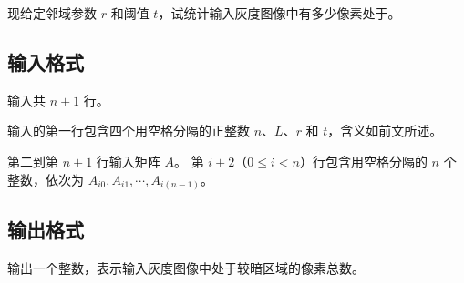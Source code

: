 现给定邻域参数 $r$ 和阈值 $t$，试统计输入灰度图像中有多少像素处于{}。


\subsection*{输入格式}

输入共 $n + 1$ 行。

输入的第一行包含四个用空格分隔的正整数 $n$、$L$、$r$ 和 $t$，含义如前文所述。

第二到第 $n + 1$ 行输入矩阵 $A$。
第 $i + 2$（$0 \le i < n$）行包含用空格分隔的 $n$ 个整数，依次为 $A_{i0}, A_{i1}, \cdots, A_{i(n-1)}$。


\subsection*{输出格式}

输出一个整数，表示输入灰度图像中处于较暗区域的像素总数。


